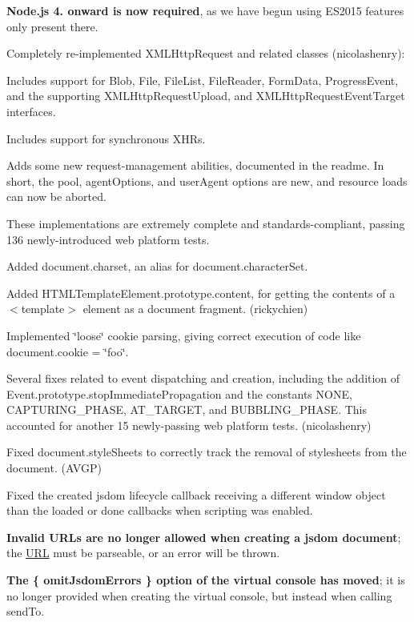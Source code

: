 \begin{DoxyItemize}
\item {\bfseries Node.\+js 4. onward is now required}, as we have begun using E\+S2015 features only present there.
\item Completely re-\/implemented {\ttfamily X\+M\+L\+Http\+Request} and related classes (nicolashenry)\+:
\begin{DoxyItemize}
\item Includes support for {\ttfamily Blob}, {\ttfamily File}, {\ttfamily File\+List}, {\ttfamily File\+Reader}, {\ttfamily Form\+Data}, {\ttfamily Progress\+Event}, and the supporting {\ttfamily X\+M\+L\+Http\+Request\+Upload}, and {\ttfamily X\+M\+L\+Http\+Request\+Event\+Target} interfaces.
\item Includes support for synchronous X\+H\+Rs.
\item Adds some new request-\/management abilities, documented in the readme. In short, the {\ttfamily pool}, {\ttfamily agent\+Options}, and {\ttfamily user\+Agent} options are new, and resource loads can now be aborted.
\item These implementations are extremely complete and standards-\/compliant, passing 136 newly-\/introduced web platform tests.
\end{DoxyItemize}
\item Added {\ttfamily document.\+charset}, an alias for {\ttfamily document.\+character\+Set}.
\item Added {\ttfamily H\+T\+M\+L\+Template\+Element.\+prototype.\+content}, for getting the contents of a {\ttfamily $<$template$>$} element as a document fragment. (rickychien)
\item Implemented \char`\"{}loose\char`\"{} cookie parsing, giving correct execution of code like {\ttfamily document.\+cookie = \char`\"{}foo\char`\"{}}.
\item Several fixes related to event dispatching and creation, including the addition of {\ttfamily Event.\+prototype.\+stop\+Immediate\+Propagation} and the constants {\ttfamily N\+O\+NE}, {\ttfamily C\+A\+P\+T\+U\+R\+I\+N\+G\+\_\+\+P\+H\+A\+SE}, {\ttfamily A\+T\+\_\+\+T\+A\+R\+G\+ET}, and {\ttfamily B\+U\+B\+B\+L\+I\+N\+G\+\_\+\+P\+H\+A\+SE}. This accounted for another 15 newly-\/passing web platform tests. (nicolashenry)
\item Fixed {\ttfamily document.\+style\+Sheets} to correctly track the removal of stylesheets from the document. (A\+V\+GP)
\item Fixed the {\ttfamily created} jsdom lifecycle callback receiving a different {\ttfamily window} object than the {\ttfamily loaded} or {\ttfamily done} callbacks when scripting was enabled.
\item {\bfseries Invalid U\+R\+Ls are no longer allowed when creating a jsdom document}; the \mbox{\hyperlink{namespace_u_r_l}{U\+RL}} must be parseable, or an error will be thrown.
\item {\bfseries The {\ttfamily \{ omit\+Jsdom\+Errors \}} option of the virtual console has moved}; it is no longer provided when creating the virtual console, but instead when calling {\ttfamily send\+To}.
\end{DoxyItemize}

